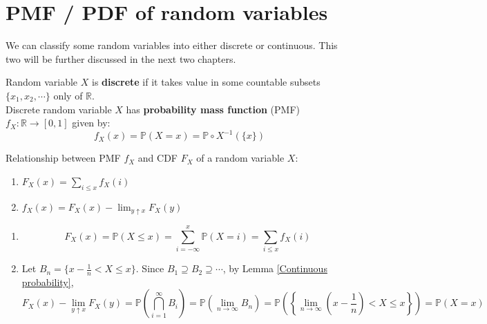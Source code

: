 \documentclass{huhtakm-template-book}
\newcommand{\prob}{\mathbb{P}}
\begin{document}
\section{PMF / PDF of random variables}
    We can classify some random variables into either discrete or continuous. This two will be further discussed in the next two chapters.
    \begin{defn}
        Random variable $X$ is \textbf{discrete} if it takes value in some countable subsets $\{x_{1},x_{2},\cdots\}$ only of $\mathbb{R}$.\\
        Discrete random variable $X$ has \textbf{probability mass function} (PMF) $f_{X}:\mathbb{R}\to [0,1]$ given by: 
        \begin{equation*}
            f_{X}(x)=\prob(X=x)=\prob\circ X^{-1}(\{x\})
        \end{equation*}
    \end{defn}
    \begin{lem}
        \label{Relationship between pmf and cdf}
        Relationship between PMF $f_{X}$ and CDF $F_{X}$ of a random variable $X$:
        \begin{enumerate}
            \item $F_{X}(x)=\sum_{i\leq x}f_{X}(i)$
            \item $f_{X}(x)=F_{X}(x)-\lim_{y\uparrow x}F_{X}(y)$
        \end{enumerate}
    \end{lem}
    \begin{proofing}
        \begin{enumerate}
            \item 
            \begin{equation*}
                F_{X}(x)=\prob(X\leq x)=\sum_{i=-\infty}^{x}\prob(X=i)=\sum_{i\leq x}f_{X}(i)
            \end{equation*}
            \item Let $B_{n}=\{x-\frac{1}{n}<X\leq x\}$. Since $B_{1}\supseteq B_{2}\supseteq\cdots$, by Lemma \ref{Continuous probability},
            \begin{equation*}
                F_{X}(x)-\lim_{y\uparrow x}F_{X}(y)=\prob\left(\bigcap_{i=1}^{\infty}B_{i}\right)=\prob\left(\lim_{n\to\infty}B_{n}\right)=\prob\left(\left\{\lim_{n\to\infty}\left(x-\frac{1}{n}\right)<X\leq x\right\}\right)=\prob(X=x)
            \end{equation*}
        \end{enumerate}
    \end{proofing}
\end{document}
